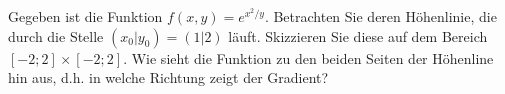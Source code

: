 \item 
Gegeben ist die Funktion $f(x,y) = e^{x^2 / y}$.
Betrachten Sie deren Höhenlinie, die durch die Stelle $(x_0|y_0)=(1|2)$ läuft. Skizzieren Sie diese auf dem Bereich $[-2;2]\times[-2;2]$.
Wie sieht die Funktion zu den beiden Seiten der Höhenline hin aus, d.h. in welche Richtung zeigt der Gradient?

